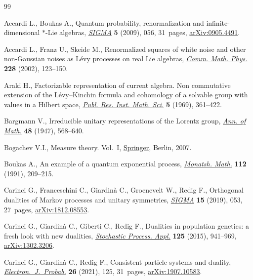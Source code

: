 \begin{thebibliography}{99}
\footnotesize\itemsep=0pt

Accardi L., Boukas A., Quantum probability, renormalization and
 infinite-dimensional {$\ast$}-{L}ie algebras, \href{https://doi.org/10.3842/SIGMA.2009.056}{\textit{SIGMA}} \textbf{5}
 (2009), 056, 31~pages, \href{https://arxiv.org/abs/0905.4491}{arXiv:0905.4491}.

Accardi L., Franz U., Skeide M., Renormalized squares of white noise and other
 non-{G}aussian noises as {L}\'evy processes on real {L}ie algebras,
 \href{https://doi.org/10.1007/s002200200647}{\textit{Comm. Math. Phys.}} \textbf{228} (2002), 123--150.

Araki H., Factorizable representation of current algebra. {N}on commutative
 extension of the {L}\'evy--{K}inchin formula and cohomology of a solvable
 group with values in a {H}ilbert space, \href{https://doi.org/10.2977/prims/1195194390}{\textit{Publ. Res. Inst. Math. Sci.}}
 \textbf{5} (1969), 361--422.

Bargmann V., Irreducible unitary representations of the {L}orentz group,
 \href{https://doi.org/10.2307/1969129}{\textit{Ann. of Math.}} \textbf{48} (1947), 568--640.

Bogachev V.I., Measure theory. {V}ol.~{I}, \href{https://doi.org/10.1007/978-3-540-34514-5}{Springer}, Berlin, 2007.

Boukas A., An example of a quantum exponential process, \href{https://doi.org/10.1007/BF01297339}{\textit{Monatsh. Math.}}
 \textbf{112} (1991), 209--215.

Carinci G., Franceschini C., Giardin\`a C., Groenevelt W., Redig F., Orthogonal
 dualities of {M}arkov processes and unitary symmetries, \href{https://doi.org/10.3842/SIGMA.2019.053}{\textit{SIGMA}}
 \textbf{15} (2019), 053, 27~pages, \href{https://arxiv.org/abs/1812.08553}{arXiv:1812.08553}.

Carinci G., Giardin\`a C., Giberti C., Redig F., Dualities in population
 genetics: a fresh look with new dualities, \href{https://doi.org/10.1016/j.spa.2014.10.009}{\textit{Stochastic Process. Appl.}}
 \textbf{125} (2015), 941--969, \href{https://arxiv.org/abs/1302.3206}{arXiv:1302.3206}.

Carinci G., Giardin\`a C., Redig F., Consistent particle systems and duality,
 \href{https://doi.org/10.1214/21-ejp684}{\textit{Electron.~J.~Probab.}} \textbf{26} (2021), 125, 31~pages,
 \href{https://arxiv.org/abs/1907.10583}{arXiv:1907.10583}.


\end{thebibliography}
